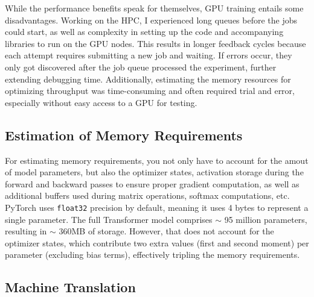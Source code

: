 While the performance benefits speak for themselves, GPU training entails some disadvantages.
Working on the HPC, I experienced long queues before the jobs could start, as well as complexity in setting up the code and accompanying libraries to run on the GPU nodes.
This results in longer feedback cycles because each attempt requires submitting a new job and waiting.
If errors occur, they only got discovered after the job queue processed the experiment, further extending debugging time.
Additionally, estimating the memory resources for optimizing throughput was time-consuming and often required trial and error, especially without easy access to a GPU for testing.

\subsection{Estimation of Memory Requirements}
For estimating memory requirements, you not only have to account for the amout of model parameters, but also the optimizer states, activation storage during the forward and backward passes to ensure proper gradient computation, as well as additional buffers used during matrix operations, softmax computations, etc.
PyTorch uses \texttt{float32} precision by default, meaning it uses 4 bytes to represent a single parameter.
The full Transformer model comprises \(\sim\) 95 million parameters, resulting in \(\sim\) 360MB of storage.
However, that does not account for the optimizer states, which contribute two extra values (first and second moment) per parameter (excluding bias terms), effectively tripling the memory requirements.
\subsection{Machine Translation}

